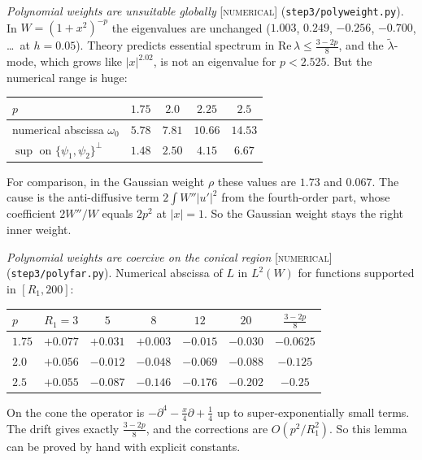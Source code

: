\documentclass[11pt]{amsart}
\theoremstyle{remark}
\newcommand{\lab}[1]{\textup{\textsc{[#1]}}}
\begin{document}
\emph{Polynomial weights are unsuitable globally} \lab{numerical} (\texttt{step3/polyweight.py}). In $W=(1+x^2)^{-p}$ the eigenvalues are unchanged ($1.003$, $0.249$, $-0.256$, $-0.700$, \dots\ at $h=0.05$). Theory predicts essential spectrum in $\mathrm{Re}\,\lambda\le\frac{3-2p}8$, and the $\tilde\lambda$-mode, which grows like $|x|^{2.02}$, is not an eigenvalue for $p<2.525$. But the numerical range is huge:
\begin{center}
\begin{tabular}{@{}lcccc@{}}
\toprule
$p$ & $1.75$ & $2.0$ & $2.25$ & $2.5$\\
\midrule
numerical abscissa $\omega_0$ & $5.78$ & $7.81$ & $10.66$ & $14.53$\\
$\sup$ on $\{\psi_1,\psi_2\}^\perp$ & $1.48$ & $2.50$ & $4.15$ & $6.67$\\
\bottomrule
\end{tabular}
\end{center}
For comparison, in the Gaussian weight $\rho$ these values are $1.73$ and $0.067$. The cause is the anti-diffusive term $2\int W''|u'|^2$ from the fourth-order part, whose coefficient $2W''/W$ equals $2p^2$ at $|x|=1$. So the Gaussian weight stays the right inner weight.

\emph{Polynomial weights are coercive on the conical region} \lab{numerical} (\texttt{step3/polyfar.py}). Numerical abscissa of $L$ in $L^2(W)$ for functions supported in $[R_1,200]$:
\begin{center}
\begin{tabular}{@{}lccccc|c@{}}
\toprule
$p$ & $R_1=3$ & $5$ & $8$ & $12$ & $20$ & $\frac{3-2p}8$\\
\midrule
$1.75$ & $+0.077$ & $+0.031$ & $+0.003$ & $-0.015$ & $-0.030$ & $-0.0625$\\
$2.0$ & $+0.056$ & $-0.012$ & $-0.048$ & $-0.069$ & $-0.088$ & $-0.125$\\
$2.5$ & $+0.055$ & $-0.087$ & $-0.146$ & $-0.176$ & $-0.202$ & $-0.25$\\
\bottomrule
\end{tabular}
\end{center}
On the cone the operator is $-\partial^4-\frac x4\partial+\frac14$ up to super-exponentially small terms. The drift gives exactly $\frac{3-2p}8$, and the corrections are $O(p^2/R_1^2)$. So this lemma can be proved by hand with explicit constants.
\end{document}
